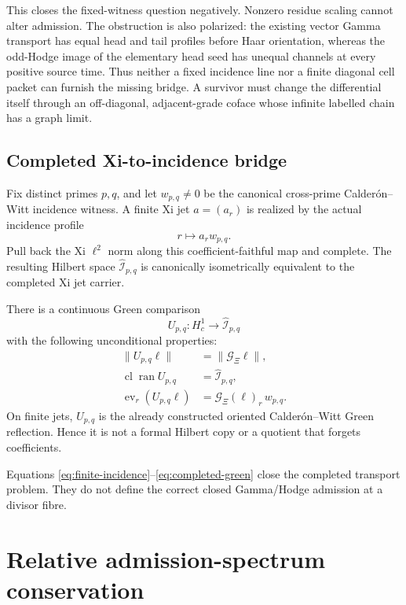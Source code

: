\documentclass[11pt]{article}
\theoremstyle{definition}
\theoremstyle{remark}
\newcommand{\cG}{\mathcal G}
\newcommand{\cI}{\mathcal I}
\newcommand{\ran}{\operatorname{ran}}
\newcommand{\cl}{\operatorname{cl}}
\begin{document}
This closes the fixed-witness question negatively.  Nonzero residue
scaling cannot alter admission.  The obstruction is also polarized: the
existing vector Gamma transport has equal head and tail profiles before
Haar orientation, whereas the odd-Hodge image of the elementary head seed
has unequal channels at every positive source time.  Thus neither a fixed
incidence line nor a finite diagonal cell packet can furnish the missing
bridge.  A survivor must change the differential itself through an
off-diagonal, adjacent-grade coface whose infinite labelled chain has a
graph limit.

\subsection{Completed Xi-to-incidence bridge}

Fix distinct primes \(p,q\), and let \(w_{p,q}\ne0\) be the canonical
cross-prime Calder\'on--Witt incidence witness.  A finite Xi jet
\(a=(a_r)\) is realized by the actual incidence profile
\[
                         r\longmapsto a_r w_{p,q}.
\tag{4.6}\label{eq:finite-incidence}
\]
Pull back the Xi \(\ell^2\) norm along this coefficient-faithful map and
complete.  The resulting Hilbert space
\(\widehat{\cI}_{p,q}\) is canonically isometrically equivalent to the
completed Xi jet carrier.

There is a continuous Green comparison
\[
 U_{p,q}:H^1_{\!c}\longrightarrow\widehat{\cI}_{p,q}
\tag{4.7}\label{eq:completed-green}
\]
with the following unconditional properties:
\begin{align}
 \|U_{p,q}\ell\|&=\|\cG_\Xi\ell\|, \tag{4.8}\\
 \cl\ran U_{p,q}&=\widehat{\cI}_{p,q}, \tag{4.9}\\
 \operatorname{ev}_r(U_{p,q}\ell)
   &=\cG_\Xi(\ell)_r\,w_{p,q}. \tag{4.10}
\end{align}
On finite jets, \(U_{p,q}\) is the already constructed oriented
Calder\'on--Witt Green reflection.  Hence it is not a formal Hilbert copy
or a quotient that forgets coefficients.

Equations \eqref{eq:finite-incidence}--\eqref{eq:completed-green} close the
completed transport problem.  They do not define the correct closed
Gamma/Hodge admission at a divisor fibre.

\section{Relative admission-spectrum conservation}
\label{sec:admission}
\end{document}
